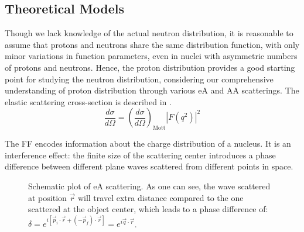 
\subsection{Theoretical Models} 
\label{subsec:models}
Though we lack knowledge of the actual neutron distribution, it is reasonable to assume that protons and neutrons share the same distribution function, with only minor variations in function parameters, even in nuclei with asymmetric numbers of protons and neutrons. Hence, the proton distribution provides a good starting point for studying the neutron distribution, considering our comprehensive understanding of proton distribution through various eA and AA scatterings. The elastic scattering cross-section is described in \cite{punjabi2015structure}.
\begin{equation}
    \frac{d\sigma}{d\Omega} = \left( \frac{d\sigma}{d\Omega} \right)_{\text{Mott}} |F(q^2)|^2
\end{equation}

The FF encodes information about the charge distribution of a nucleus. It is an interference
effect: the finite size of the scattering center introduces a phase difference between
different plane waves scattered from different points in space.
\begin{figure}
    \centering
    \caption[eA scattering]{Schematic plot of eA scattering. As one can see, the wave scattered
    at position $\vec{r}$ will travel extra distance compared to the one scattered
    at the object center, which leads to a phase difference of:
    $\delta = e^{i[\vec{p}_i \cdot \vec{r} + (-\vec{p}_f) \cdot \vec{r}]} = e^{i\vec{q}\cdot\vec{r}}$.
    }
    \label{fig:FF_phase_diff}
\end{figure}

